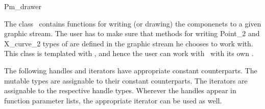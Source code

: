 
\ccRefPageBegin


\begin{ccRefConcept}{Pm_drawer}


\ccDefinition
The class \ccRefName\ contains functions for writing (or drawing) the  componenets to a given graphic stream. 
The user has to make sure that methods for writing Point_2 and X_curve_2 types of  are defined in the graphic stream he chooses to work with.
This class is templated with , and hence the user can work with \ccRefName\ with its own . 
 

\ccTypes

The following handles and iterators have appropriate constant counterparts. The mutable types are assignable to their
constant counterparts. The iterators are assignable to the respective handle types. 
Wherever the handles appear in function parameter lists, the appropriate iterator can be used as well. 

\end{ccRefConcept}
